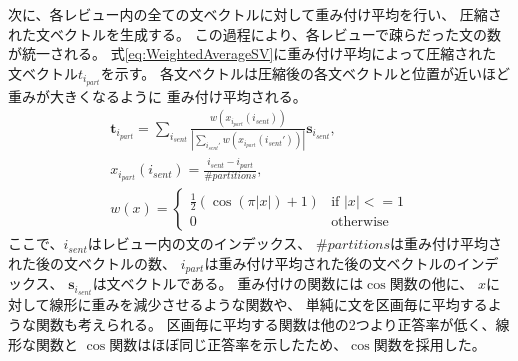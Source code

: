 \documentclass[twocolumn,a4paper]{ltjarticle}
\begin{document}
次に、各レビュー内の全ての文ベクトルに対して重み付け平均を行い、
圧縮された文ベクトルを生成する。
この過程により、各レビューで疎らだった文の数が統一される。
式\ref{eq:WeightedAverageSV}に重み付け平均によって圧縮された
文ベクトル$t_{i_{part}}$を示す。
各文ベクトルは圧縮後の各文ベクトルと位置が近いほど重みが大きくなるように
重み付け平均される。
\begin{gather}
  \mathbf{t}_{i_{part}} = \sum_{i_{sent}}
                          \frac{w(x_{i_{part}}(i_{sent}))}
                               {|\sum_{i_{sent}'} w(x_{i_{part}}(i_{sent}'))|}
                          \mathbf{s}_{i_{sent}},
  \label{eq:WeightedAverageSV} \\
  x_{i_{part}}(i_{sent}) = \frac{i_{sent} - i_{part}}{\#partitions},
  \nonumber \\
  w(x) = \begin{cases}
    \frac{1}{2} (\cos(\pi|x|) + 1) &\text{if $|x| <= 1$} \\
    0 &\text{otherwise}
  \end{cases} \nonumber
\end{gather}
ここで、$i_{sent}$はレビュー内の文のインデックス、
$\#partitions$は重み付け平均された後の文ベクトルの数、
$i_{part}$は重み付け平均された後の文ベクトルのインデックス、
$\mathbf{s}_{i_{sent}}$は文ベクトルである。
重み付けの関数には$\cos$関数の他に、
$x$に対して線形に重みを減少させるような関数や、
単純に文を区画毎に平均するような関数も考えられる。
区画毎に平均する関数は他の2つより正答率が低く、線形な関数と
$\cos$関数はほぼ同じ正答率を示したため、$\cos$関数を採用した。
\end{document}
